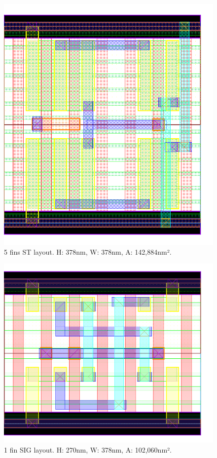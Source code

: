 \documentclass[pgmicro,diss,english]{iiufrgs}
\begin{document}
\begin{figure}[]
\centering
\includegraphics[width=\textwidth,height=\textheight,keepaspectratio]{ST5F.png}
\caption{5 fins ST layout. H: 378nm, W: 378nm, A: 142,884nm².}
\label{fig:ST5F}
\end{figure}






\begin{figure}[]
\centering
\includegraphics[width=\textwidth,height=\textheight,keepaspectratio]{SIG1F.png}
\caption{1 fin SIG layout. H: 270nm, W: 378nm, A: 102,060nm².}
\label{fig:SIG1F}
\end{figure}
\end{document}

